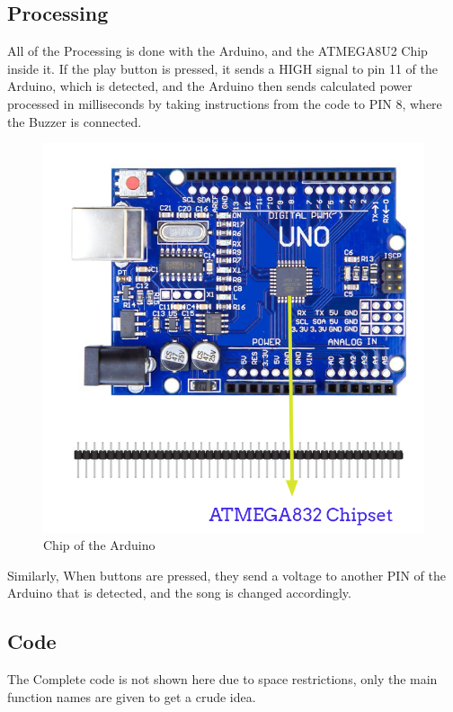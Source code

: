 \documentclass[11pt]{article}
\begin{document}
\subsection{Processing}

All of the Processing is done with the Arduino, and the ATMEGA8U2 Chip inside it. If the play button is pressed, it sends a HIGH signal to pin 11 of the Arduino, which is detected, and the Arduino then sends calculated power processed in milliseconds by taking instructions from the code to PIN 8, where the Buzzer is connected. \\

\begin{figure}[H]
	\centering
	\includegraphics[scale=.45]{chipset.jpg}
	\caption{Chip of the Arduino}
	\label{fig:chipset pic}
\end{figure}

Similarly, When buttons are pressed, they send a voltage to another PIN of the Arduino that is detected, and the song is changed accordingly. 

\subsection{Code}
The Complete code is not shown here due to space restrictions, only the main function names are given to get a crude idea.
 
\end{document}
